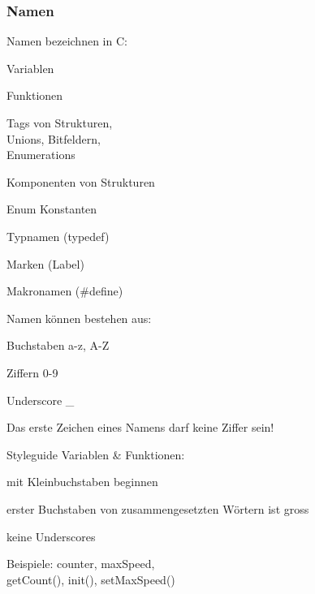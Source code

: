  		\subsubsection{Namen}
 			\begin{minipage}[t]{5 cm}
 				Namen bezeichnen in C:
 				\begin{compactitem}
					\item Variablen
					\item Funktionen
					\item Tags von Strukturen, \\Unions, Bitfeldern, \\Enumerations
					\item Komponenten von Strukturen
					\item Enum Konstanten
					\item Typnamen (typedef)
					\item Marken (Label)
					\item Makronamen (\#define)
 				\end{compactitem}
 			\end{minipage}
 			\hspace*{1.0cm}
 			\begin{minipage}[t]{5 cm}
	 			Namen können bestehen aus:
	 			\begin{compactitem}
					\item Buchstaben a-z, A-Z
					\item Ziffern 0-9
					\item Underscore \_
	 			\end{compactitem}
	 			\vspace*{0.2cm} 
	 			Das erste Zeichen eines Namens darf keine Ziffer sein!
	 		\end{minipage}
	 		\hspace*{1.0cm}
	 		\begin{minipage}[t]{6 cm}
		 		Styleguide Variablen \& Funktionen:
		 		\begin{compactitem}
		 			\item mit Kleinbuchstaben beginnen	 			
		 			\item erster Buchstaben von zusammengesetzten Wörtern ist gross	
		 			\item keine Underscores
		 		\end{compactitem}
		 		\vspace*{0.2cm} 
		 		Beispiele: counter, maxSpeed, \\getCount(), init(), setMaxSpeed()	
	 		\end{minipage}	
		
